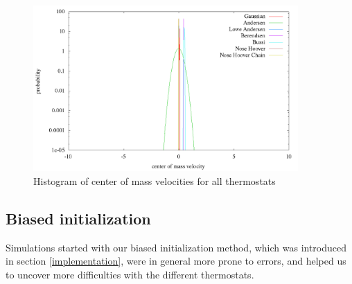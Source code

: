 \begin{figure}[H]
\centering
\includegraphics[width=0.9\textwidth]{./graphics/Histogramm_schwerVel_rand_T=20_p=64.png}
\caption{Histogram of center of mass velocities for all thermostats}
\label{im:schwerVel_rand}
\end{figure} 

\newpage
\subsection{Biased initialization}
Simulations started with our biased initialization method, which was introduced in section \ref{implementation}, were in general more prone to errors, and helped us to uncover more difficulties with the different thermostats. 

